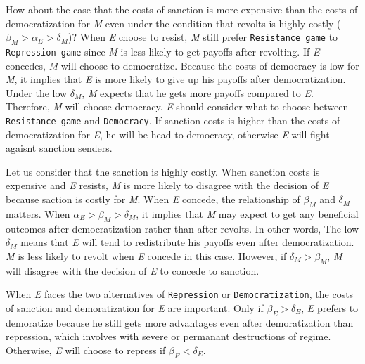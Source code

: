 \documentclass[11pt]{article}
\begin{document}
How about the case that the costs of sanction is more expensive than the costs of democratization for \textit{M} even under the condition that revolts is highly costly ($\beta_{M} > \alpha_{E} > \delta_{M}$)? When \textit{E} choose to resist, \textit{M} still prefer \texttt{Resistance game} to \texttt{Repression game} since \textit{M} is less likely to get payoffs after revolting. If \textit{E} concedes, \textit{M} will choose to democratize. Because the costs of democracy is low for \textit{M}, it implies that \textit{E} is more likely to give up his payoffs after democratization. Under the low $\delta_{M}$, \textit{M} expects that he gets more payoffs compared to \textit{E}. Therefore, \textit{M} will choose democracy. \textit{E} should consider what to choose between \texttt{Resistance game} and \texttt{Democracy}. If sanction costs is higher than the costs of democratization for \textit{E}, he will be head to democracy, otherwise \textit{E} will fight agaisnt sanction senders.


Let us consider that the sanction is highly costly. When sanction costs is expensive and \textit{E} resists, \textit{M} is more likely to disagree with the decision of \textit{E} because saction is costly for \textit{M}. When \textit{E} concede, the relationship of $\beta_{M}$ and $\delta_{M}$ matters. When $\alpha_{E} > \beta_{M} > \delta_{M}$, it implies that \textit{M} may expect to get any beneficial outcomes after democratization rather than after revolts. In other words, The low $\delta_{M}$ means that \textit{E} will tend to redistribute his payoffs even after democratization. \textit{M} is less likely to revolt when \textit{E} concede in this case. However, if $\delta_{M} > \beta_{M}$, \textit{M} will disagree with the decision of \textit{E} to concede to sanction.

When \textit{E} faces the two alternatives of \texttt{Repression} or \texttt{Democratization}, the costs of sanction and demoratization for \textit{E} are important. Only if $\beta_{E} > \delta_{E}$, \textit{E} prefers to demoratize because he  still gets more advantages even after demoratization than repression, which involves with severe or permanant destructions of regime. Otherwise, \textit{E} will choose to repress if $\beta_{E} < \delta_{E}$.
\end{document}
